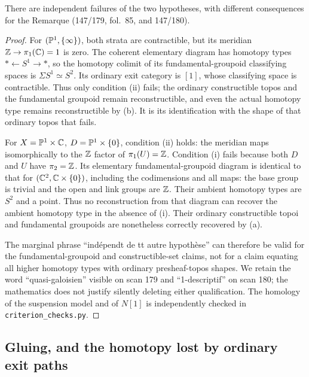 \begin{example}\label{P1c2}
There are independent failures of the two hypotheses, with different
consequences for the Remarque (147/179, fol.~85, and 147/180).
\end{example}
\begin{proof}
For $(\mathbb P^1,\{\infty\})$, both strata are contractible, but its
meridian $\mathbb Z\to\pi_1(\mathbb C)=1$ is zero.  The coherent elementary
diagram has homotopy types $*\leftarrow S^1\to *$, so the
homotopy colimit of its fundamental-groupoid classifying spaces is
$\Sigma S^1\simeq S^2$.  Its ordinary exit category is $[1]$,
whose classifying space is contractible.  Thus only condition (ii)
fails; the ordinary constructible topos and the fundamental groupoid
remain reconstructible, and even the actual homotopy type remains
reconstructible by (b).  It is its identification with the shape of
that ordinary topos that fails.

For $X=\mathbb P^1\times\mathbb C$, $D=\mathbb P^1\times\{0\}$, condition (ii)
holds: the meridian maps isomorphically to the $\mathbb Z$ factor of
$\pi_1(U)=\mathbb Z$.  Condition (i) fails because both $D$ and $U$
have $\pi_2=\mathbb Z$.  Its elementary fundamental-groupoid diagram is
identical to that for $(\mathbb C^2,\mathbb C\times\{0\})$, including the
codimensions and all maps: the base group is trivial and the open
and link groups are $\mathbb Z$.  Their ambient homotopy types are $S^2$
and a point.  Thus no reconstruction from that diagram can recover
the ambient homotopy type in the absence of (i).  Their ordinary
constructible topoi and fundamental groupoids are nonetheless
correctly recovered by (a).

The marginal phrase ``indépendt de tt autre hypothèse'' can therefore
be valid for the fundamental-groupoid and constructible-set claims,
not for a claim equating all higher homotopy types with ordinary
presheaf-topos shapes.  We retain the word ``quasi-galoisien'' visible
on scan 179 and ``1-descriptif'' on scan 180; the mathematics does not
justify silently deleting either qualification.  The homology of
the suspension model and of $N[1]$ is independently checked in
\texttt{criterion\_checks.py}.
\end{proof}

\subsection{Gluing, and the homotopy lost by ordinary exit paths}

